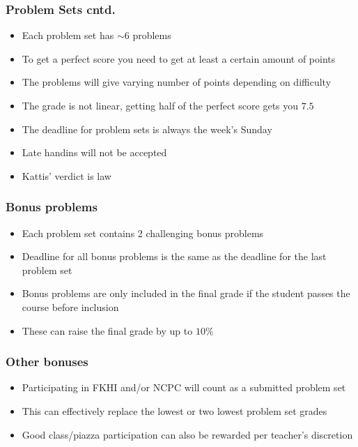 \documentclass{beamer}
\begin{document}
\begin{frame}[plain]
	\frametitle{Problem Sets cntd.}
	\begin{itemize}
	    \item Each problem set has $\sim 6$ problems
        \item To get a perfect score you need to get at least a certain amount of points
        \item The problems will give varying number of points depending on difficulty
        \item The grade is not linear, getting half of the perfect score gets you $7.5$
        \item The deadline for problem sets is always the week's Sunday
        \item Late handins will not be accepted
        \item Kattis' verdict is law
	\end{itemize}
\end{frame}

\begin{frame}[plain]
	\frametitle{Bonus problems}
	\begin{itemize}
	    \item Each problem set contains 2 challenging bonus problems
        \item Deadline for all bonus problems is the same as the deadline for the last problem set
        \item Bonus problems are only included in the final grade if the student passes the course before inclusion
        \item These can raise the final grade by up to $10\%$
	\end{itemize}
\end{frame}

\begin{frame}[plain]
	\frametitle{Other bonuses}
	\begin{itemize}
	    \item Participating in FKHI and/or NCPC will count as a submitted problem set
	    \item This can effectively replace the lowest or two lowest problem set grades
	    \item Good class/piazza participation can also be rewarded per teacher's discretion
	\end{itemize}
\end{frame}
\end{document}
